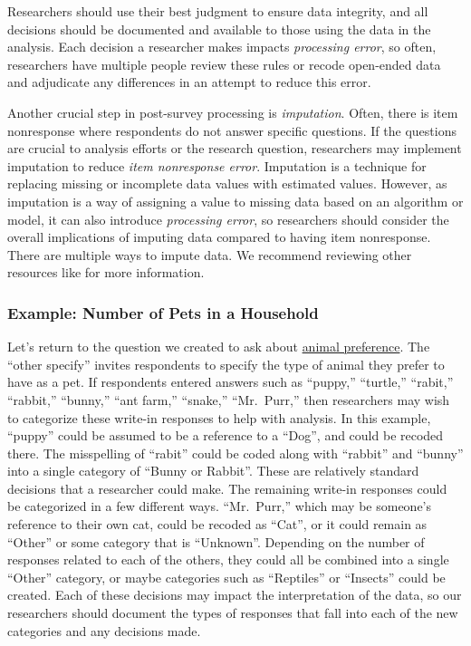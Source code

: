 \documentclass[
]{krantz}
\begin{document}
Researchers should use their best judgment to ensure data integrity, and all decisions should be documented and available to those using the data in the analysis. Each decision a researcher makes impacts \emph{processing error}, so often, researchers have multiple people review these rules or recode open-ended data and adjudicate any differences in an attempt to reduce this error.

Another crucial step in post-survey processing is \emph{imputation}. Often, there is item nonresponse where respondents do not answer specific questions. If the questions are crucial to analysis efforts or the research question, researchers may implement imputation to reduce \emph{item nonresponse error}. Imputation is a technique for replacing missing or incomplete data values with estimated values. However, as imputation is a way of assigning a value to missing data based on an algorithm or model, it can also introduce \emph{processing error}, so researchers should consider the overall implications of imputing data compared to having item nonresponse. There are multiple ways to impute data. We recommend reviewing other resources like \citet{Kim2021} for more information.

\hypertarget{overview-post-cleaning-ex}{%
\subsubsection*{Example: Number of Pets in a Household}\label{overview-post-cleaning-ex}}


Let's return to the question we created to ask about \protect\hyperlink{overview-design-questionnaire-ex}{animal preference}. The ``other specify'' invites respondents to specify the type of animal they prefer to have as a pet. If respondents entered answers such as ``puppy,'' ``turtle,'' ``rabit,'' ``rabbit,'' ``bunny,'' ``ant farm,'' ``snake,'' ``Mr.~Purr,'' then researchers may wish to categorize these write-in responses to help with analysis. In this example, ``puppy'' could be assumed to be a reference to a ``Dog'', and could be recoded there. The misspelling of ``rabit'' could be coded along with ``rabbit'' and ``bunny'' into a single category of ``Bunny or Rabbit''. These are relatively standard decisions that a researcher could make. The remaining write-in responses could be categorized in a few different ways. ``Mr.~Purr,'' which may be someone's reference to their own cat, could be recoded as ``Cat'', or it could remain as ``Other'' or some category that is ``Unknown''. Depending on the number of responses related to each of the others, they could all be combined into a single ``Other'' category, or maybe categories such as ``Reptiles'' or ``Insects'' could be created. Each of these decisions may impact the interpretation of the data, so our researchers should document the types of responses that fall into each of the new categories and any decisions made.
\end{document}
